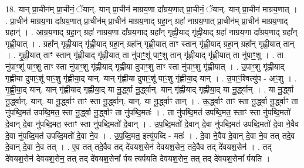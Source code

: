 \documentclass[17pt]{extarticle}
\begin{document}
18. यान् प्रा॒चीन॑म् प्रा॒चीनं॒ ॅयान्. यान् प्रा॒चीन॑ माग्रय॒णा दा᳚ग्रय॒णात् प्रा॒चीनं॒ ॅयान्. यान् प्रा॒चीन॑ माग्रय॒णात् । . प्रा॒चीन॑ माग्रय॒णा दा᳚ग्रय॒णात् प्रा॒चीन॑म् प्रा॒चीन॑ माग्रय॒णाद् ग्रहा॒न् ग्रहा॑ नाग्रय॒णात् प्रा॒चीन॑म् प्रा॒चीन॑ माग्रय॒णाद् ग्रहान्॑ । . आ॒ग्र॒य॒णाद् ग्रहा॒न् ग्रहा॑ नाग्रय॒णा दा᳚ग्रय॒णाद् ग्रहा᳚न् गृह्णी॒याद् गृ॑ह्णी॒याद् ग्रहा॑ नाग्रय॒णा दा᳚ग्रय॒णाद् ग्रहा᳚न् गृह्णी॒यात् । . ग्रहा᳚न् गृह्णी॒याद् गृ॑ह्णी॒याद् ग्रहा॒न् ग्रहा᳚न् गृह्णी॒यात् ताꣳ स्तान् गृ॑ह्णी॒याद् ग्रहा॒न् ग्रहा᳚न् गृह्णी॒यात् तान् । . गृ॒ह्णी॒यात् ताꣳ स्तान् गृ॑ह्णी॒याद् गृ॑ह्णी॒यात् ता नु॑पाꣳ॒॒शू॑ पाꣳ॒॒शु तान् गृ॑ह्णी॒याद् गृ॑ह्णी॒यात् ता नु॑पाꣳ॒॒शु । . ता नु॑पाꣳ॒॒शू॑ पाꣳ॒॒शु ताꣳ स्ता नु॑पाꣳ॒॒शु गृ॑ह्णीयाद् गृह्णीया दुपाꣳ॒॒शु ताꣳ स्ता 
नु॑पाꣳ॒॒शु गृ॑ह्णीयात् । . उ॒पाꣳ॒॒शु गृ॑ह्णीयाद् गृह्णीया दुपाꣳ॒॒शू॑ पाꣳ॒॒शु गृ॑ह्णीया॒द् यान्. यान् गृ॑ह्णीया दुपाꣳ॒॒शू॑ पाꣳ॒॒शु गृ॑ह्णीया॒द् यान् । . उ॒पाꣳ॒॒श्वित्यु॑प - अꣳ॒॒शु । . गृ॒ह्णी॒या॒द् यान्. यान् गृ॑ह्णीयाद् गृह्णीया॒द् या नू॒र्द्ध्वा नू॒र्द्ध्वान्. यान् गृ॑ह्णीयाद् गृह्णीया॒द् या नू॒र्द्ध्वान् । . या नू॒र्द्ध्वा नू॒र्द्ध्वान्. यान्. या नू॒र्द्ध्वाꣳ ताꣳ स्ता नू॒र्द्ध्वान्. यान्. या नू॒र्द्ध्वाꣳ तान् । . ऊ॒र्द्ध्वाꣳ ताꣳ स्ता नू॒र्द्ध्वा नू॒र्द्ध्वाꣳ ता नु॑पब्दि॒मत॑ उपब्दि॒मत॒ स्ता नू॒र्द्ध्वा नू॒र्द्ध्वाꣳ ता नु॑पब्दि॒मतः॑ । . ता नु॑पब्दि॒मत॑ उपब्दि॒मत॒ स्ताꣳ स्ता नु॑पब्दि॒मतो॑ दे॒वान् दे॒वा नु॑पब्दि॒मत॒ स्ताꣳ स्ता नु॑पब्दि॒मतो॑ दे॒वान् । . उ॒प॒ब्दि॒मतो॑ दे॒वान् दे॒वा नु॑पब्दि॒मत॑ उपब्दि॒मतो॑ दे॒वा ने॒वैव दे॒वा नु॑पब्दि॒मत॑ उपब्दि॒मतो॑ दे॒वा ने॒व । . उ॒प॒ब्दि॒मत॒ इत्यु॑पब्दि - मतः॑ । . दे॒वा ने॒वैव दे॒वान् दे॒वा ने॒व तत् तदे॒व दे॒वान् दे॒वा ने॒व तत् । . ए॒व तत् तदे॒वैव तद् दे॑वयश॒सेन॑ देवयश॒सेन॒ तदे॒वैव तद् दे॑वयश॒सेन॑ । . तद् दे॑वयश॒सेन॑ देवयश॒सेन॒ तत् तद् दे॑वयश॒सेना᳚ र्पय त्यर्पयति देवयश॒सेन॒ तत् तद् दे॑वयश॒सेना᳚ र्पयति । \newline
\end{document}
